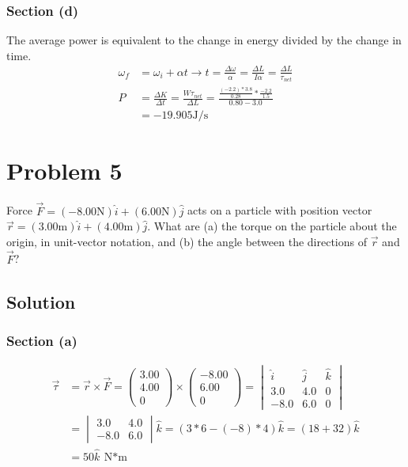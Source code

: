 \documentclass[12pt]{article}
\begin{document}
\subsubsection{Section (d)}
The average power is equivalent to the change in energy divided by the change in time. 
\begin{align}
    \omega_f    &=  \omega_i + \alpha t
        \rightarrow t   =   \frac{\Delta \omega}{\alpha} = \frac{\Delta L}{I\alpha} = \frac{\Delta L}{\tau_{net}}\\
    P   &=  \frac{\Delta K}{\Delta t}
        =   \frac{W\tau_{net}}{\Delta L}
        =   \frac{\frac{(-2.2)*3.8}{0.28}*\frac{-2.2}{1.5}}{0.80 - 3.0}\\
        &=  \boxed{-19.905\unit{\joule/\second}}
\end{align}

\pagebreak
\section{Problem 5}
Force $\vec{F} = (-8.00\unit{\newton})\hat{i} + (6.00\unit{\newton})\hat{j}$ acts on a particle with position vector $\vec{r} = (3.00\unit{\meter})\hat{i} + (4.00\unit{\meter})\hat{j}$. What are (a) the torque on the particle about the origin, in unit-vector notation, and (b) the angle between the directions of $\vec{r}$ and $\vec{F}$?

\subsection{Solution}
\subsubsection{Section (a)}
\begin{align}
    \vec{\tau}  &=  \vec{r}\times\vec{F}
        =   \begin{pmatrix}3.00\\4.00\\0\end{pmatrix} \times \begin{pmatrix}-8.00\\6.00\\0\end{pmatrix}
        =   \begin{vmatrix}
                \hat{i}&\hat{j}&\hat{k}\\
                3.0&4.0&0\\
                -8.0&6.0&0
            \end{vmatrix}\\
        &=  \begin{vmatrix}3.0&4.0\\-8.0&6.0\end{vmatrix}\hat{k}
        =   (3*6 - (-8)*4)\hat{k}
        =   (18 + 32)\hat{k}\\
        &=  \boxed{50\hat{k}\ \unit{\newton*\meter}}
\end{align}
\end{document}
